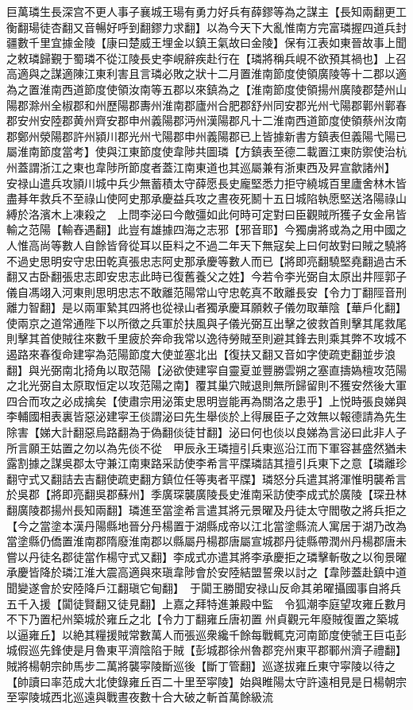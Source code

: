 巨萬璘生長深宫不更人事子襄城王瑒有勇力好兵有薛鏐等為之謀主【長知兩翻更工衡翻瑒徒杏翻又音暢好呼到翻鏐力求翻】以為今天下大亂惟南方完富璘握四道兵封疆數千里宜據金陵【康曰楚威王埋金以鎮王氣故曰金陵】保有江表如東晉故事上聞之敕璘歸覲于蜀璘不從江陵長史李峴辭疾赴行在【璘將稱兵峴不欲預其禍也】上召高適與之謀適陳江東利害且言璘必敗之狀十二月置淮南節度使領廣陵等十二郡以適為之置淮南西道節度使領汝南等五郡以來鎮為之【淮南節度使領揚州廣陵郡楚州山陽郡滁州全椒郡和州歷陽郡夀州淮南郡廬州合肥郡舒州同安郡光州弋陽郡鄿州鄿春郡安州安陸郡黄州齊安郡申州義陽郡沔州漢陽郡凡十二淮南西道節度使領蔡州汝南郡鄭州滎陽郡許州潁川郡光州弋陽郡申州義陽郡已上皆據新書方鎮表但義陽弋陽已屬淮南節度當考】使與江東節度使韋陟共圖璘【方鎮表至德二載置江東防禦使治杭州蓋謂浙江之東也韋陟所節度者蓋江南東道也其巡屬兼有浙東西及昇宣歙諸州】　安禄山遣兵攻頴川城中兵少無蓄積太守薛愿長史龐堅悉力拒守繞城百里廬舍林木皆盡朞年救兵不至祿山使阿史那承慶益兵攻之晝夜死鬭十五日城陷執愿堅送洛陽祿山縛於洛濱木上凍殺之　上問李泌曰今敵彊如此何時可定對曰臣觀賊所獲子女金帛皆輸之范陽【輸舂遇翻】此豈有雄據四海之志邪【邪音耶】今獨虜將或為之用中國之人惟高尚等數人自餘皆脅從耳以臣料之不過二年天下無寇矣上曰何故對曰賊之驍將不過史思明安守忠田乾真張忠志阿史那承慶等數人而已【將即亮翻驍堅堯翻過古禾翻又古卧翻張忠志即安忠志此時已復舊養父之姓】今若令李光弼自太原出井陘郭子儀自馮翊入河東則思明忠志不敢離范陽常山守忠乾真不敢離長安【令力丁翻陘音刑離力智翻】是以兩軍縶其四將也從禄山者獨承慶耳願敕子儀勿取華陰【華戶化翻】使兩京之道常通陛下以所徵之兵軍於扶風與子儀光弼互出擊之彼救首則擊其尾救尾則擊其首使賊往來數千里疲於奔命我常以逸待勞賊至則避其鋒去則乘其弊不攻城不遏路來春復命建寜為范陽節度大使並塞北出【復扶又翻又音如字使疏吏翻並步浪翻】與光弼南北掎角以取范陽【泌欲使建寜自靈夏並豐勝雲朔之塞直擣媯檀攻范陽之北光弼自太原取恒定以攻范陽之南】覆其巢穴賊退則無所歸留則不獲安然後大軍四合而攻之必成擒矣【使肅宗用泌策史思明豈能再為關洛之患乎】上悦時張良娣與李輔國相表裏皆惡泌建寜王倓謂泌曰先生舉倓於上得展臣子之效無以報德請為先生除害【娣大計翻惡烏路翻為于偽翻倓徒甘翻】泌曰何也倓以良娣為言泌曰此非人子所言願王姑置之勿以為先倓不從　甲辰永王璘擅引兵東巡沿江而下軍容甚盛然猶未露割據之謀吳郡太守兼江南東路采訪使李希言平牒璘詰其擅引兵東下之意【璘離珍翻守式又翻詰去吉翻使疏吏翻方鎮位任等夷者平牒】璘怒分兵遣其將渾惟明襲希言於吳郡【將即亮翻吳郡蘇州】季廣琛襲廣陵長史淮南采訪使李成式於廣陵【琛丑林翻廣陵郡揚州長知兩翻】璘進至當塗希言遣其將元景曜及丹徒太守閻敬之將兵拒之【今之當塗本漢丹陽縣地晉分丹楊置于湖縣成帝以江北當塗縣流人寓居于湖乃改為當塗縣仍僑置淮南郡隋廢淮南郡以縣屬丹楊郡唐屬宣城郡丹徒縣帶潤州丹楊郡唐未嘗以丹徒名郡徒當作楊守式又翻】李成式亦遣其將李承慶拒之璘擊斬敬之以徇景曜承慶皆降於璘江淮大震高適與來瑱韋陟會於安陸結盟誓衆以討之【韋陟蓋赴鎮中道聞變遂會於安陸降戶江翻瑱它甸翻】　于闐王勝聞安禄山反命其弟曜攝國事自將兵五千入援【闐徒賢翻又徒見翻】上嘉之拜特進兼殿中監　令狐潮李庭望攻雍丘數月不下乃置杞州築城於雍丘之北【令力丁翻雍丘唐初置州貞觀元年廢賊復置之築城以逼雍丘】以絶其糧援賊常數萬人而張巡衆纔千餘每戰輒克河南節度使虢王巨屯彭城假巡先鋒使是月魯東平濟陰陷于賊【彭城郡徐州魯郡兖州東平郡鄆州濟子禮翻】賊將楊朝宗帥馬步二萬將襲寜陵斷巡後【斷丁管翻】巡遂拔雍丘東守寜陵以待之【帥讀曰率范成大北使錄雍丘百二十里至寜陵】始與睢陽太守許遠相見是日楊朝宗至寜陵城西北巡遠與戰晝夜數十合大破之斬首萬餘級流
